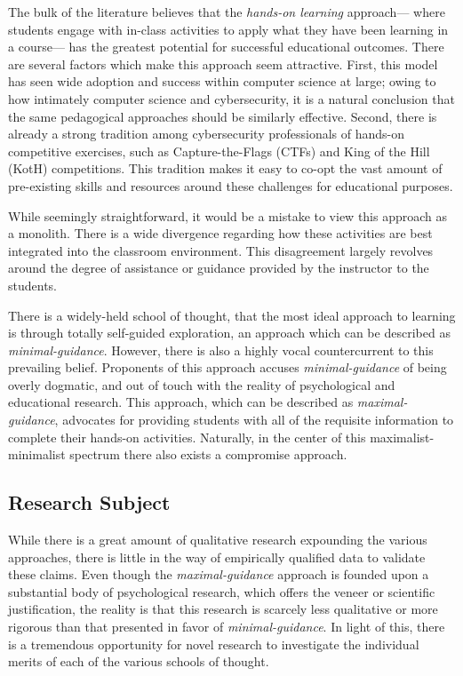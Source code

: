 \documentclass{article}
\begin{document}
    The bulk of the literature believes that the \emph{hands-on learning} approach---
    where students engage with in-class activities to apply what they have been learning in a course---
    has the greatest potential for successful educational outcomes. 
    There are several factors which make this approach seem attractive.
    First, this model has seen wide adoption and success within computer science at large; 
    owing to how intimately computer science and cybersecurity, it is a natural conclusion that the same pedagogical approaches should be similarly effective. 
    Second, there is already a strong tradition among cybersecurity professionals of hands-on competitive exercises, such as Capture-the-Flags (CTFs) and King of the Hill (KotH) competitions. 
    This tradition makes it easy to co-opt the vast amount of pre-existing skills and resources around these challenges for educational purposes. 

    While seemingly straightforward, it would be a mistake to view this approach as a monolith.
    There is a wide divergence regarding how these activities are best integrated into the classroom environment.
    This disagreement largely revolves around the degree of assistance or guidance provided by the instructor to the students. 

    There is a widely-held school of thought, that the most ideal approach to learning is through totally self-guided exploration, an approach which can be described as \emph{minimal-guidance}. 
    However, there is also a highly vocal countercurrent to this prevailing belief. 
    Proponents of this approach accuses \emph{minimal-guidance} of being overly dogmatic, and out of touch with the reality of psychological and educational research. 
    This approach, which can be described as \emph{maximal-guidance}, advocates for providing students with all of the requisite information to complete their hands-on activities. 
    Naturally, in the center of this maximalist-minimalist spectrum there also exists a compromise approach.

    \subsection{Research Subject} %

    While there is a great amount of qualitative research expounding the various approaches, there is little in the way of empirically qualified data to validate these claims. 
    Even though the \emph{maximal-guidance} approach is founded upon a substantial body of psychological research, which offers the veneer or scientific justification, the reality is that this research is scarcely less qualitative or more rigorous than that presented in favor of \emph{minimal-guidance}. 
    In light of this, there is a tremendous opportunity for novel research to investigate the individual merits of each of the various schools of thought.
\end{document}
